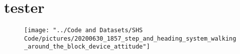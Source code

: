 \chapter{tester}%


\begin{figure}
	\centering
	\texttt{[image: "../Code and Datasets/SHS Code/pictures/20200630\_1857\_step\_and\_heading\_system\_walking\_around\_the\_block\_device\_attitude"]}
	\caption{}
	\label{fig:202006301857stepandheadingsystemwalkingaroundtheblockdeviceattitude}
\end{figure}
